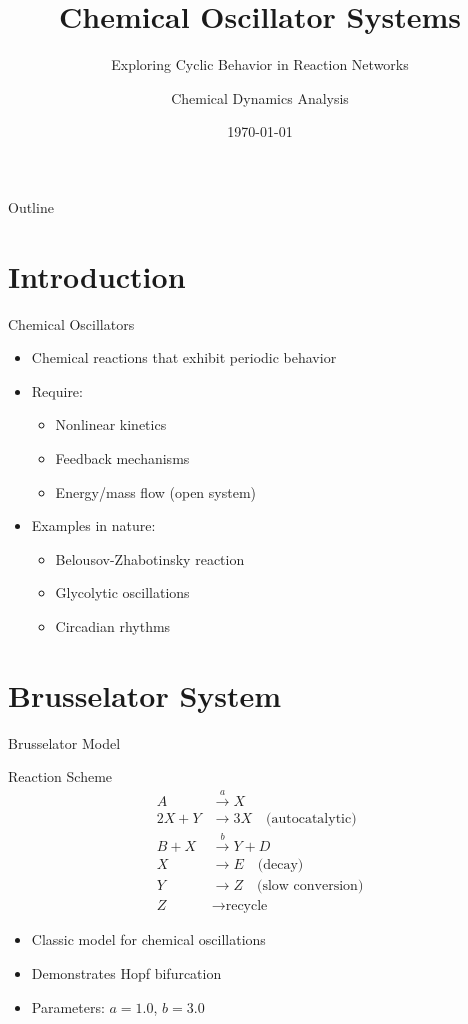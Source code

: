 \documentclass{beamer}
\title{Chemical Oscillator Systems}
\subtitle{Exploring Cyclic Behavior in Reaction Networks}
\author{Chemical Dynamics Analysis}
\date{\today}
\begin{document}
\begin{frame}
\titlepage
\end{frame}

\begin{frame}{Outline}
\tableofcontents
\end{frame}

\section{Introduction}

\begin{frame}{Chemical Oscillators}
\begin{itemize}
    \item Chemical reactions that exhibit periodic behavior
    \item Require:
    \begin{itemize}
        \item Nonlinear kinetics
        \item Feedback mechanisms
        \item Energy/mass flow (open system)
    \end{itemize}
    \item Examples in nature:
    \begin{itemize}
        \item Belousov-Zhabotinsky reaction
        \item Glycolytic oscillations
        \item Circadian rhythms
    \end{itemize}
\end{itemize}
\end{frame}

\section{Brusselator System}

\begin{frame}{Brusselator Model}
\begin{block}{Reaction Scheme}
\begin{align}
A &\xrightarrow{a} X \\
2X + Y &\xrightarrow{} 3X \quad \text{(autocatalytic)} \\
B + X &\xrightarrow{b} Y + D \\
X &\xrightarrow{} E \quad \text{(decay)} \\
Y &\xrightarrow{} Z \quad \text{(slow conversion)} \\
Z &\xrightarrow{} \text{recycle}
\end{align}
\end{block}

\begin{itemize}
    \item Classic model for chemical oscillations
    \item Demonstrates Hopf bifurcation
    \item Parameters: $a = 1.0$, $b = 3.0$
\end{itemize}
\end{frame}
\end{document}
